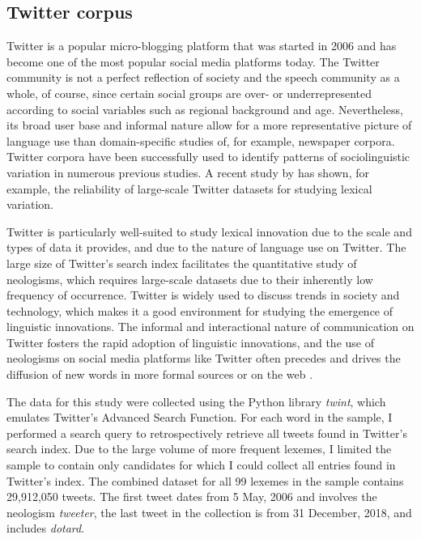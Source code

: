 \documentclass[
  a4paper,
  abstract=on,
  captions=tableabove,
  ]{scrartcl}
\newcommand{\ol}[1]{\emph{#1}}
\begin{document}
  \subsection{Twitter corpus}
    \label{subsec:twitter-data}

    Twitter is a popular micro-blogging platform that was started in 2006 and has become one of the most popular social media platforms today. The Twitter community is not a perfect reflection of society and the speech community as a whole, of course, since certain social groups are over- or underrepresented according to social variables such as regional background and age. Nevertheless, its broad user base and informal nature allow for a more representative picture of language use than domain-specific studies of, for example, newspaper corpora. Twitter corpora have been successfully used to identify patterns of sociolinguistic variation in numerous previous studies. A recent study by \textcite{Grieve2019MappingLexical} has shown, for example, the reliability of large-scale Twitter datasets for studying lexical variation.

    Twitter is particularly well-suited to study lexical innovation due to the scale and types of data it provides, and due to the nature of language use on Twitter. The large size of Twitter's search index facilitates the quantitative study of neologisms, which requires large-scale datasets due to their inherently low frequency of occurrence. Twitter is widely used to discuss trends in society and technology, which makes it a good environment for studying the emergence of linguistic innovations. The informal and interactional nature of communication on Twitter fosters the rapid adoption of linguistic innovations, and the use of neologisms on social media platforms like Twitter often precedes and drives the diffusion of new words in more formal sources or on the web \parencite{Wurschinger2016UsingWeb}.

    The data for this study were collected using the Python library \emph{twint}, which emulates Twitter's Advanced Search Function. For each word in the sample, I performed a search query to retrospectively retrieve all tweets found in Twitter's search index. Due to the large volume of more frequent lexemes, I limited the sample to contain only candidates for which I could collect all entries found in Twitter's index. The combined dataset for all 99 lexemes in the sample contains 29,912,050 tweets. The first tweet dates from 5 May, 2006 and involves the neologism \ol{tweeter}, the last tweet in the collection is from 31 December, 2018, and includes \ol{dotard}.
\end{document}

